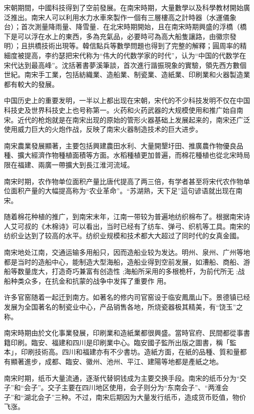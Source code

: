宋朝期間，中國科技得到了空前發展。在南宋時期，大量數學以及科學教材開始廣泛推出。南宋人可以利用水力水車來製作一個有三層樓高之計時器（水運儀象台）；首次測量降雨量、降雪量．在北宋時期開始，且在南宋時期興盛的浮橋（橋下是可以浮在水上的東西，多為充氣品，必要時可為高大船隻讓路，由徽宗發明）；且拱橋技術出現等。韓信點兵等數學問題也得到了完整的解釋；圓周率的精細度被提高，李约瑟把宋代称为“伟大的代数学家的时代”，认为“中国的代数学在宋代达到最高峰”。沈括著書夢溪筆談，首次進行諧振現象的實驗，領先西方數個世紀。南宋手工業，包括紡織業、造船業、制瓷業、造紙業、印刷業和火器製造業都有較大的發展。

中国历史上的重要发明，一半以上都出现在宋朝，宋代的不少科技发明不仅在中国科技史及世界科技史上也号称第一。火药和火药武器的大规模使用和推广始自南宋。近代的枪炮就是在南宋出现的原始的管形火器基础上发展起来的，南宋还广泛使用威力巨大的火炮作战，反映了南宋火器制造技术的巨大进步。

南宋農業發展顯著，主要包括興建農田水利、大量開墾圩田、推廣農作物優良品種、擴大經濟作物種植面積等方面。水稻種植更加普遍，而棉花種植也從北宋時局限在福建、兩廣一帶擴大到長江淮河流域。

南宋时期，农作物单位面积产量比唐代提高了两三倍，有学者甚至将宋代农作物单位面积产量的大幅提高称为“农业革命”。“苏湖熟，天下足”這句谚语就出现在南宋。

随着棉花种植的推广，到南宋末年，江南一带较为普遍地纺织棉布了。根据南宋诗人艾可叔的《木棉诗》可以看出，当时已经有了纺车、弹弓、织机等工具。南宋的纺织业达到了较高的水平。纺织业规模和技术都大大超过了同时代的女真金國。

南宋地处江南，交通运输多用船只，因而造船业较为发达。明州、泉州、广州等地都是当时的造船中心，能制造大型海船，造船业得到空前发展，如漕船、商船、游船等数量庞大，打造奇巧兼富有创造性 ;海船所采用的多根桅杆，为前代所无 ;战船种类众多，在抗金和抗蒙的战争中发挥了重要作 用。

许多官窑随着一起迁到南方。如著名的修内司官窑设于临安鳳凰山下。景德镇已经发展为全国著名的制瓷业中心，产品销售各地，所烧瓷器极其精美，有“饶玉”之称。

南宋時期由於文化事業發展，印刷業和造紙業都很興盛。當時官府、民間都從事書籍印刷。臨安、福建和四川是印刷業中心。臨安國子監所出版之圖書，稱「監本」，印刷技術高。四川和福建亦有不少書坊。造紙方面，在紙的品種、質和量都有顯著進步，成都、臨安、徽州、池州、平江、建陽等地都是產紙之地。

南宋时期，纸币大量流通，逐渐代替铜钱成为主要交换手段。南宋的纸币分为“交子”和“会子”。交子主要在四川地区使用，会子则分为“东南会子”、“两淮会子”和“湖北会子”三种。不过，南宋后期因为大量发行纸币，造成货币贬值，物价飞涨。

